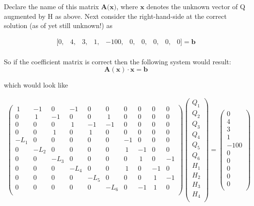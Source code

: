 Declare the name of this matrix $\textbf{A(x)}$, where $\textbf{x}$ denotes the unknown vector of Q augmented by H as above.  Next consider the right-hand-side at the correct solution (as of yet still unknown!) as

\begin{displaymath}
\begin{matrix}
[0, & 4, & 3,  & 1, & -100 , & 0, & 0, & 0, & 0, &0 ] = \textbf{b}\\
 \end{matrix}
 \end{displaymath}

So if the coefficient matrix is correct then the following system would result:
\begin{displaymath}
\mathbf{A(x)} \cdot \mathbf{x} = \mathbf{b}
  \end{displaymath}
  
  which would look like
  
 \begin{gather}
\begin{pmatrix}
~1&-1 & 0  & -1 & 0 & 0 & 0 & 0 & 0 &0 \\
0&~1 & -1  & 0 & 0 &~1 & 0 & 0 & 0 &0 \\
0& 0 & 0 &~1 & -1 & -1 & 0 & 0 & 0 &0 \\
0& 0 &~1  & 0 &~1 & 0 & 0  & 0 & 0 &0 \\
\hline
-L_1& 0& 0 & 0 & 0 & 0 & -1 & 0 & 0 &0 \\
0& -L_2& 0 & 0 & 0 & 0&~1 & -1 & 0 &0 \\
0& 0& -L_3 & 0 & 0 & 0& 0 &~1 & 0 & -1 \\
0& 0& 0 & -L_4 & 0 & 0&~1 & 0 & -1 & 0 \\
0& 0& 0 & 0 & -L_5 & 0& 0 & 0 &~1 & -1 \\
0& 0& 0 &0 & 0 & -L_6& 0 & -1 &~1 & 0 \\
\end{pmatrix}
\begin{pmatrix}
Q_1\\
Q_2\\
Q_3\\
Q_4\\
Q_5\\
Q_6\\
H_1\\
H_2\\
H_3\\
H_4\\
\end{pmatrix}
=
\begin{pmatrix}
0\\
4\\
3\\
1\\
\hline
-100\\
0\\
0\\
0\\
0\\
0\\
\end{pmatrix}
\end{gather}


